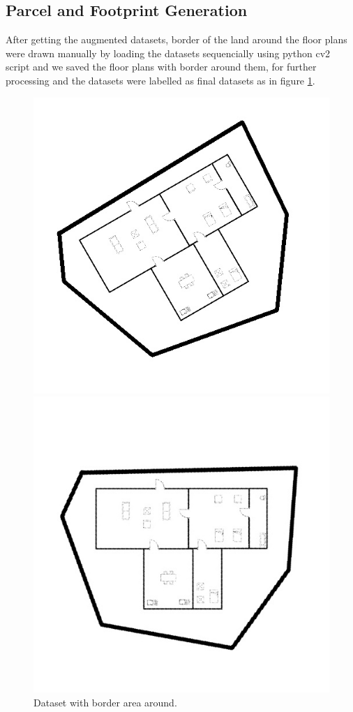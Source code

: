             \subsection{Parcel and Footprint Generation}
            After getting the augmented datasets, border of the land around the floor plans were drawn manually by loading the datasets sequencially using python cv2 script and we saved  the floor plans with border around them, for further processing and the datasets were labelled as final datasets as in figure \ref{fig:dataset-final}.
            \begin{figure}[h]
                \centering
                \begin{minipage}{.45\textwidth}
                    \centering
                    \includegraphics[width=.8\linewidth,frame]{img/experiment/dataset/1final.jpg}
                    \caption{Dataset with border area around.}
                    \label{fig:dataset-final}
                \end{minipage}%
                \hfill
                \begin{minipage}{.45\textwidth}
                    \centering
                    \includegraphics[width=.8\linewidth,frame]{img/experiment/dataset/2final_rotated.jpg}

\end{minipage}
\end{figure}
